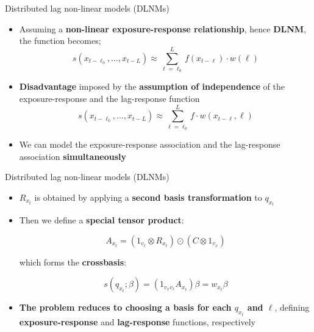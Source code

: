 \documentclass[english]{beamer}
\newcommand{\alertblue}[1]{{\color{blue}#1}}
\begin{document}
\begin{frame}{Distributed lag non-linear models (DLNMs)}
    \begin{itemize}
        \item Assuming a \textbf{\alertblue{non-linear exposure-response relationship}}, hence \textbf{\alertblue{DLNM}}, the function becomes;
        \[
        s(x_{t-\ell_0}, \dots, x_{t-L}) \approx \sum_{\ell = \ell_0}^{L} f(x_{t-\ell}) \cdot w( \ell) 
        \]
        \item \textbf{\alertblue{Disadvantage}} imposed by the \textbf{\alertblue{assumption of independence}} of the exposure-response and the lag-response function
        \[s(x_{t-\ell_0}, \dots, x_{t-L}) \approx \sum_{\ell = \ell_0}^{L} f \cdot w(x_{t-\ell}, \ell)\]
        \item We can model the exposure-response association and the lag-response association \textbf{\alertblue{simultaneously}}
    \end{itemize}
\end{frame}

\begin{frame}{Distributed lag non-linear models (DLNMs)}
\begin{itemize}
    \item \textbf{\alertblue{\( R_{x_t} \)}} is obtained by applying a \textbf{\alertblue{second basis transformation}} to \textbf{\alertblue{\( q_{x_t} \)}}

    \item Then we define a \textbf{\alertblue{special tensor product}}:

\[A_{x_t} = (1_{v_\ell} \otimes R_{x_t}) \odot (C \otimes 1_{v_x})\]

which forms the \textbf{\alertblue{crossbasis}}:

\[s(q_{x_t}; \beta) = (1_{v_x v_\ell} A_{x_t}) \beta = w_{x_t} \beta\]

    \item \textbf{\alertblue{The problem reduces to choosing a basis for each \( q_{x_t} \) and \( \ell \)}}, defining \textbf{\alertblue{exposure-response}} and \textbf{\alertblue{lag-response}} functions, respectively
\end{itemize}
\end{frame}

    
    
\end{document}
